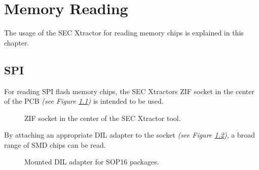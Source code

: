 \documentclass[a4paper]{report}
\begin{document}
\chapter{Memory Reading}
The usage of the SEC Xtractor for reading memory chips is explained in this chapter.
\section{SPI}
For reading SPI flash memory chips, the SEC Xtractors ZIF socket in the center of the PCB \textit{(see Figure \ref{fig:center_socket})} is intended to be used.
\begin{figure}[ht] 
  \centering
  {
   \setlength{\fboxsep}{0pt}
   \setlength{\fboxrule}{0.5pt}
  }
  \caption{ZIF socket in the center of the SEC Xtractor tool.}
  \label{fig:center_socket}
\end{figure}
By attaching an appropriate DIL adapter to the socket \textit{(see Figure \ref{fig:attached_adapter})}, a broad range of SMD chips can be read.
\begin{figure}[ht] 
  \centering
  {
   \setlength{\fboxsep}{0pt}
   \setlength{\fboxrule}{0.5pt}
  }
  \caption{Mounted DIL adapter for SOP16 packages.}
  \label{fig:attached_adapter}
\end{figure}
\end{document}
